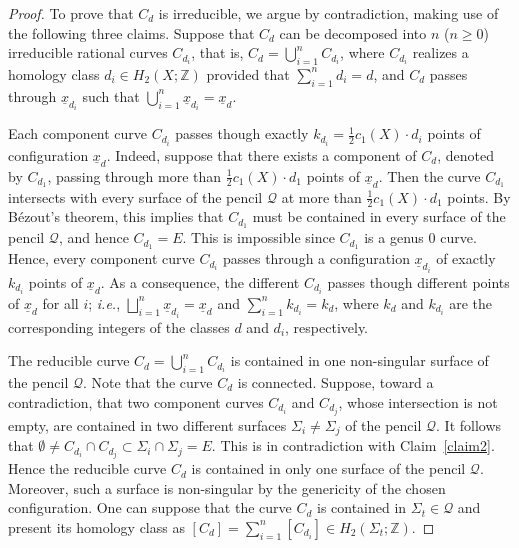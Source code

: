 \documentclass[10pt,a4paper]{article}
\numberwithin{equation}{section}
\theoremstyle{definition}
\theoremstyle{plain}
\theoremstyle{remark}
\newenvironment{claim}[1]{\renewcommand\theinnercustomclaim{#1}\innercustomclaim}{\endinnercustomclaim}
\newcommand{\Z}{\mathbb{Z}}
\begin{document}
\begin{proof}
To prove that $C_d$ is irreducible, we argue by contradiction, making use of the following three claims. Suppose that $C_d$ can be decomposed into $n$ ($n\geq 0$) irreducible rational curves $C_{d_i}$, that is, $C_d=\bigcup_{i=1}^{n} C_{d_i}$, where $C_{d_i}$ realizes a homology class $d_i\in H_2(X;\mathbb{Z})$ provided that $\sum_{i=1}^{n}d_i=d$, and  $C_d$  passes through $\underline{x}_{d_i}$ such that $\bigcup_{i=1}^{n}\underline{x}_{d_i}=\underline{x}_d$.


\begin{claim}{2A}\label{claim2}
  Each component curve $C_{d_i}$ passes though exactly $k_{d_i}=\frac{1}{2}c_1(X)\cdot d_i$ points of configuration $\underline{x}_d$.
  \end{claim} 
Indeed, suppose that there exists a component of $C_d$, denoted by $C_{d_1}$, passing through more than $\frac{1}{2}c_1(X)\cdot d_1$ points of $\underline{x}_d$. Then the curve $C_{d_1}$ intersects with every surface of the pencil $\mathcal{Q}$ at more than $\frac{1}{2}c_1(X)\cdot d_1$ points. By B\'ezout's theorem, this implies that $C_{d_1}$ must be contained in every surface of the pencil $\mathcal{Q}$, and hence $C_{d_1} = E$. This is impossible since $C_{d_1}$ is a genus $0$ curve. Hence, every component curve $C_{d_i}$ passes through a configuration $\underline{x}_{d_i}$ of exactly $k_{d_i}$
points of $\underline{x}_d$. As a consequence, the different $C_{d_i}$ passes though different points of $\underline{x}_d$ for all $i$; \textit{i.e.}, $\bigsqcup_{i=1}^{n}\underline{x}_{d_i}=\underline{x}_d$ and $\sum_{i=1}^{n}k_{d_i}=k_d$, where $k_d$ and $k_{d_i}$ are the corresponding integers of the classes $d$ and $d_i$, respectively.

\begin{claim}{2B}\label{claim2B}
  The reducible curve $C_d=\bigcup_{i=1}^{n} C_{d_i}$ is contained in one non-singular surface of the pencil $\mathcal{Q}$.
\end{claim}
Note that the curve $C_d$ is connected. Suppose, toward a contradiction, that two component curves $C_{d_i}$ and $C_{d_j}$, whose intersection is not empty, are contained in two different surfaces $\Sigma_i\neq \Sigma_j$ of the pencil $\mathcal{Q}$. It follows that $\emptyset \neq C_{d_i}\cap C_{d_j}\subset \Sigma_i\cap\Sigma_j=E$. This is in contradiction with Claim~\ref{claim2}. 
Hence the reducible curve $C_d$ is contained in only one  surface of the pencil $\mathcal{Q}$. Moreover, such a surface is non-singular by the genericity of the chosen configuration. One can suppose that the curve $C_d$ is contained in $\Sigma_t\in \mathcal{Q}$ and  present its homology class as $[C_d]=\sum_{i=1}^{n} [C_{d_i}]\in H_2(\Sigma_t;\Z)$.



\end{proof}
\end{document}
